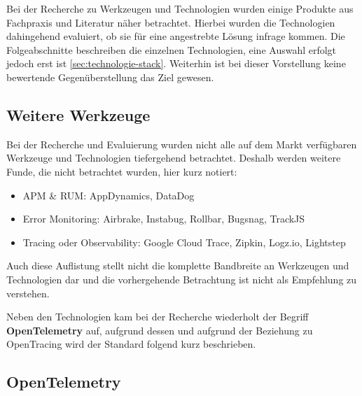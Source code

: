 
Bei der Recherche zu Werkzeugen und Technologien wurden einige Produkte aus Fachpraxis und Literatur näher betrachtet. Hierbei wurden die Technologien dahingehend evaluiert, ob sie für eine angestrebte Lösung infrage kommen. Die Folgeabschnitte beschreiben die einzelnen Technologien, eine Auswahl erfolgt jedoch erst ist \autoref{sec:technologie-stack}. Weiterhin ist bei dieser Vorstellung keine bewertende Gegenüberstellung das Ziel gewesen.

\subsection{Weitere Werkzeuge}
\label{sec:weitere-werkzeuge}

Bei der Recherche und Evaluierung wurden nicht alle auf dem Markt verfügbaren Werkzeuge und Technologien tiefergehend betrachtet. Deshalb werden weitere Funde, die nicht betrachtet wurden, hier kurz notiert:

\begin{itemize}
	\item APM \& RUM: AppDynamics, DataDog
	\item Error Monitoring: Airbrake, Instabug, Rollbar, Bugsnag, TrackJS
	\item Tracing oder Observability: Google Cloud Trace, Zipkin, Logz.io, Lightstep
\end{itemize}

Auch diese Auflistung stellt nicht die komplette Bandbreite an Werkzeugen und Technologien dar und die vorhergehende Betrachtung ist nicht als Empfehlung zu verstehen.

Neben den Technologien kam bei der Recherche wiederholt der Begriff \textbf{OpenTelemetry} auf, aufgrund dessen und aufgrund der Beziehung zu OpenTracing wird der Standard folgend kurz beschrieben.

\newpage

\subsection{OpenTelemetry}

